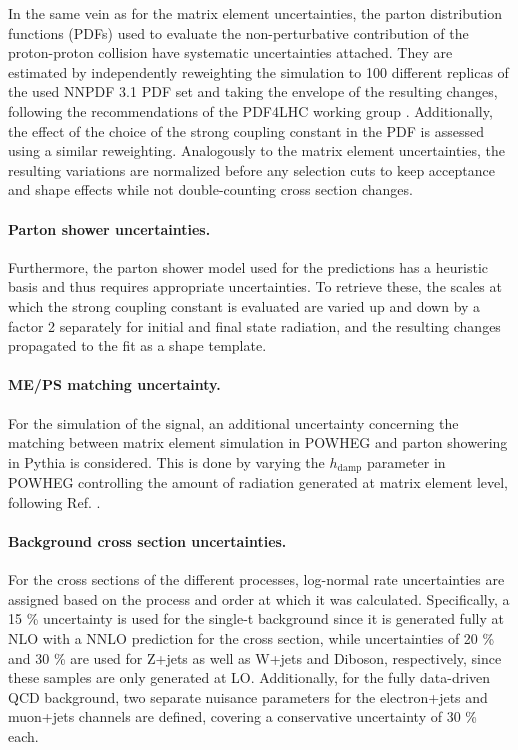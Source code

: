 In the same vein as for the matrix element uncertainties, the parton distribution functions (PDFs) used to evaluate the non-perturbative contribution of the proton-proton collision have systematic uncertainties attached. They are estimated by independently reweighting the simulation to 100 different replicas of the used NNPDF 3.1 PDF set and taking the envelope of the resulting changes, following the recommendations of the PDF4LHC working group \cite{Butterworth:2015oua}. Additionally, the effect of the choice of the strong coupling constant in the PDF is assessed using a similar reweighting. Analogously to the matrix element uncertainties, the resulting variations are normalized before any selection cuts to keep acceptance and shape effects while not double-counting cross section changes.

\paragraph{Parton shower uncertainties.}

Furthermore, the parton shower model used for the predictions has a heuristic basis and thus requires appropriate uncertainties. To retrieve these, the scales at which the strong coupling constant is evaluated are varied up and down by a factor 2 separately for initial and final state radiation, and the resulting changes propagated to the fit as a shape template.

\paragraph{ME/PS matching uncertainty.}

For the simulation of the \ttbar signal, an additional uncertainty concerning the matching between matrix element simulation in POWHEG and parton showering in Pythia is considered. This is done by varying the $h_{\mathrm{damp}}$ parameter in POWHEG controlling the amount of radiation generated at matrix element level, following Ref. \cite{CMS:TOP-16-021}.

\paragraph{Background cross section uncertainties.}

For the cross sections of the different processes, log-normal rate uncertainties are assigned based on the process and order at which it was calculated. Specifically, a 15 \% uncertainty is used for the single-t background since it is generated fully at NLO with a NNLO prediction for the cross section, while uncertainties of 20 \% and 30 \% are used for Z+jets as well as W+jets and Diboson, respectively, since these samples are only generated at LO. Additionally, for the fully data-driven QCD background, two separate nuisance parameters for the electron+jets and muon+jets channels are defined, covering a conservative uncertainty of 30 \% each.

